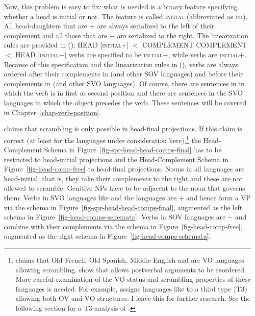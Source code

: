 Now, this problem is easy to fix: what is needed is a binary feature specifying whether a head is
initial or not. The feature is called \textsc{initial} (abbreviated as \textsc{ini}). All
head-daughters that are \ini{}+ are always serialized to the left of their complement and all those
that are \ini{}$-$ are serialized to the right. The linearization rules are provided in ():
\eal
\label{lp-regeln}
\ex HEAD [\textsc{initial}+] $<$ COMPLEMENT
\ex COMPLEMENT $<$  HEAD [\textsc{initial}$-$]
\zl
{} verbs are specified to be \textsc{initial}$-$, while  verbs are
\textsc{initial}$+$. Because of this specification and the linearization rules in (), verbs
are always ordered after their complements in  (and other SOV languages) and before their
complements in  (and other SVO languages). Of course, there are sentences in  in which
the verb is in first or second position and there are sentences in the  SVO languages in
which the object precedes the verb. These sentences will be covered in
Chapter~\ref{chap-verb-position}.


\citet[]{Haider2020a} claims that scrambling is only possible in
head-final projections. If this claim is correct (at least for the
languages under consideration here),\footnote{
  \citet[]{Santorini93a} claims that Old French, Old Spanish, Middle English and 
  are VO languages allowing scrambling. \citet*{TGC2021a-u} show that  allows postverbal
  arguments to be reordered. More careful examination of the VO status and scrambling
  properties of these languages is needed. For example, \citet[Section~3]{Haider2021a} assigns languages like  to a
  third type (T3) allowing both OV and VO structures. I leave this for further research. See the
  following section for a T3-analysis of .
} the Head-Complement Schema in Figure~\ref{fig-spr-head-head-comps-final} has to
be restricted to head-initial projections and the Head-Complement Schema in Figure~\ref{fig-head-comp-free} to
head-final projections. Nouns in all  languages are head-initial, that is, they take their
complements to the right and these are not allowed to scramble. Genitive NPs have to be adjacent to
the noun that governs them:
\eal
{}
\zl
Verbs in SVO languages like  and the  languages are \initial{}$+$ and hence form a
VP via the schema in Figure~\ref{fig-spr-head-head-comps-final}, augmented as the left schema in
Figure~\ref{fig-head-comps-schemata}. Verbs in SOV languages are \initial{}$-$ and combine with their
complements via the schema in Figure~\ref{fig-head-comp-free}, augmented as the right schema in
Figure~\ref{fig-head-comps-schemata}. 

